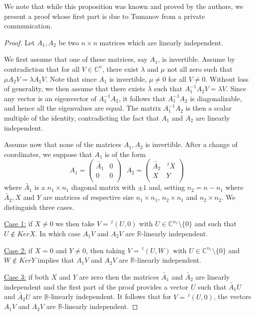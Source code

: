 \documentclass[10pt,a4paper]{amsart}
\newcommand{\C}{\mathbb C}
\newcommand{\R}{\mathbb R}
\newcommand{\transp}{\,^t}
\numberwithin{equation}{section}
\begin{document}
We note that while this proposition was known and proved by the authors, we present a  proof whose first part is due to Tumanov from a private communication.  
\begin{proof}
Let $A_1,A_2$ be two $n\times n$  matrices which are linearly independent. 

We first assume  that one of these matrices, say $A_1$, is invertible.
Assume by contradiction that for all  $V \in \C^n$, there exist $\lambda$  and  $\mu$  not all zero such that $\mu A_2V=\lambda A_1V.$ Note that since $A_1$ is invertible, $\mu \ne 0$ for all $V\ne 0.$  Without loss of generality, we  then assume that there exists  $\lambda$  such  that  $A_1^{-1}A_2V=\lambda V$. Since any vector is an eigenvector of  $A_1^{-1}A_2$, it follows that $A_1^{-1}A_2$ is diagonalizable, and hence all the eigenvalues are equal. The matrix $A_1^{-1}A_2$ is then  a scalar multiple of the identity, contradicting the fact that $A_1$ and $A_2$ are linearly independent.

\vspace{0.2cm} 
Assume now that none of the matrices $A_1,A_2$ is invertible. After a change of coordinates, we suppose that $A_1$ is of the form 
$$A_1=
 \begin{pmatrix} \tilde{A_1} & 0 \\ 
 0 & 0 \\
 \end{pmatrix} \ \ \ A_2= 
 \begin{pmatrix} \tilde{A_2} & \transp \overline{X} \\ 
 X & Y \\
 \end{pmatrix} \ \ \ $$
where $ \tilde{A_1}$ is a $n_1\times n_1$ diagonal matrix with $\pm 1$ and, setting $n_2=n-n_1$  where  $\tilde{A_2}, X$ and $Y$ are matrices of respective size $n_1\times n_1$,  $n_2 \times n_1$ and $n_2 \times n_2$. We distinguish three cases.    

\noindent \underline {Case 1:} if $X \neq 0$  we then take $V=\transp (U,0)$ with $U \in \C^{n_1} \setminus \{0\}$ and such that  $U \notin Ker X$. In which case $A_1V$ and $A_2 V$ are $\R$-linearly independent.

\noindent \underline {Case 2:} if $X=0$ and $Y \neq 0$, then taking $V=\transp (U,W)$ with $U \in \C^{n_1} \setminus \{0\}$ and $W \notin Ker Y$ implies that  $A_1V$ and $A_2 V$ are $\R$-linearly independent.

\noindent \underline {Case 3:} if both  $X$ and $Y$ are zero then the matrices $ \tilde{A_1}$ and $ \tilde{A_2}$ are linearly independent and the first part of the proof provides a vector $U$ such that  $\tilde{A_1}U$ and $ \tilde{A_2}U $ are $\R$-linearly independent. It follows that for $V=\transp (U,0)$, the vectors $A_1V$ and $A_2V$ are $\R$-linearly independent. 
\end{proof}
\end{document}
